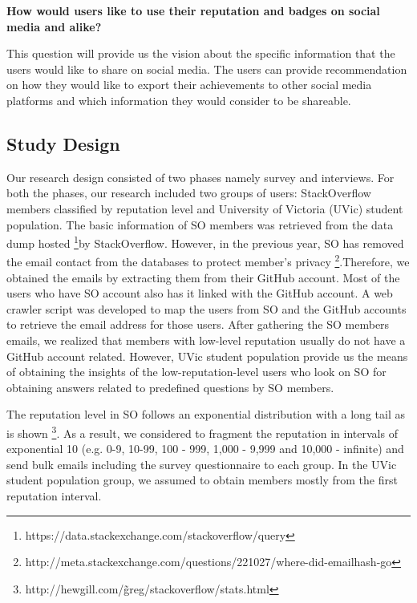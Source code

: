 \documentclass{sigchi}
\begin{document}
\textbf{How would users like to use their reputation and badges
on social media and alike?}

This question will provide us the vision about the specific information that the users would like to share on social media. The users can provide recommendation on how they would like to export their achievements to other social media platforms and which information they would consider to be shareable.

\bigskip

\subsection{Study Design}
Our research design consisted of two phases namely survey and interviews. For both the phases, our research included two groups of users: StackOverflow members classified by reputation level and University of Victoria (UVic) student population. The basic information of SO members was retrieved from the data dump hosted \footnote{https://data.stackexchange.com/stackoverflow/query}by StackOverflow. However, in the previous year, SO has removed the email contact from the databases to protect member's privacy \footnote{http://meta.stackexchange.com/questions/221027/where-did-emailhash-go}.Therefore, we obtained the emails by extracting them from their GitHub account. Most of the users who have SO account also has it linked with the GitHub account. A web crawler script was developed to map the users from SO and the GitHub accounts to retrieve the email address for those users. After gathering the SO members emails, we realized that members with low-level reputation usually do not have a GitHub account related. However, UVic student population provide us the means of obtaining the insights of the low-reputation-level users who look on SO for obtaining answers related to predefined questions by SO members. 

The reputation level in SO follows an exponential distribution with a long tail as is shown \footnote{http://hewgill.com/\~greg/stackoverflow/stats.html}. As a result, we considered to fragment the reputation in intervals of exponential 10 (e.g. 0-9, 10-99, 100 - 999, 1,000 - 9,999 and 10,000 - infinite) and send bulk emails including the survey questionnaire to each group. In the UVic student population group, we assumed to obtain members mostly from the first reputation interval. 
\end{document}
